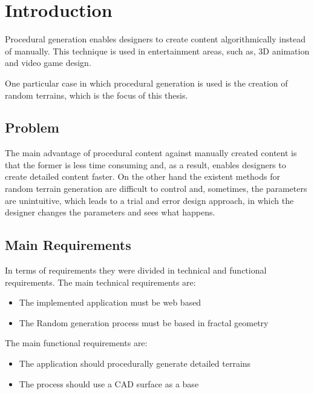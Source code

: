 \chapter{Introduction}

Procedural generation enables designers to create content algorithmically instead of manually. This technique is used in entertainment areas, such as, 3D animation and video game design.

One particular case in which procedural generation is used is the creation of random terrains, which is the focus of this thesis.


\section {Problem}

The main advantage of procedural content against manually created content is that the former is less time consuming and, as a result, enables designers to create detailed content faster. On the other hand the existent methods for random terrain generation are difficult to control and, sometimes, the parameters are unintuitive, which leads to a trial and error design approach, in which the designer changes the parameters and sees what happens.

\section{Main Requirements}

In terms of requirements they were divided in technical and functional requirements. The main technical requirements are:	
\begin{itemize}
  \item The implemented application must be web based
  \item The Random generation process must be based in fractal geometry
\end{itemize}
The main functional requirements are:
\begin{itemize}
  \item The application should procedurally generate detailed terrains
  \item The process should use a CAD surface as a base
\end{itemize}


